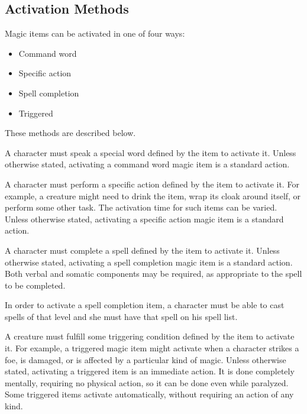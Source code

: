     \subsection{Activation Methods}
        Magic items can be activated in one of four ways:

        \begin{itemize}
            \item Command word
            \item Specific action
            \item Spell completion
            \item Triggered
        \end{itemize}

        These methods are described below.

         A character must speak a special word defined by the item to activate it.
        Unless otherwise stated, activating a command word magic item is a standard action.

         A character must perform a specific action defined by the item to activate it.
        For example, a creature might need to drink the item, wrap its cloak around itself, or perform some other task.
        The activation time for such items can be varied.
        Unless otherwise stated, activating a specific action magic item is a standard action.

         A character must complete a spell defined by the item to activate it.
        Unless otherwise stated, activating a spell completion magic item is a standard action.
        Both verbal and somatic components may be required, as appropriate to the spell to be completed.

        In order to activate a spell completion item, a character must be able to cast spells of that level and she must have that spell on his spell list.

         A creature must fulfill some triggering condition defined by the item to activate it.
        For example, a triggered magic item might activate when a character strikes a foe, is damaged, or is affected by a particular kind of magic.
        Unless otherwise stated, activating a triggered item is an immediate action.
        It is done completely mentally, requiring no physical action, so it can be done even while paralyzed.
        Some triggered items activate automatically, without requiring an action of any kind.

